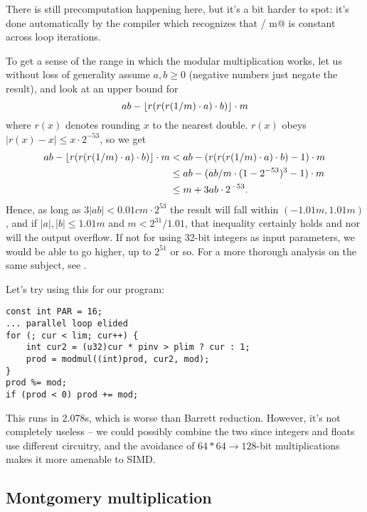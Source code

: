 There is still precomputation happening here, but it's a bit harder to spot: it's done automatically by the compiler which recognizes that  / m@ is constant across loop iterations.

To get a sense of the range in which the modular multiplication works, let us without loss of generality assume $a,b \ge 0$ (negative numbers just negate the result), and look at an upper bound for
\[ ab - \lfloor r(r(r(1/m)\cdot a)\cdot b)\rfloor \cdot m \]
where $r(x)$ denotes rounding $x$ to the nearest double.
$r(x)$ obeys $|r(x) - x| \le x \cdot 2^{-53}$, so we get
\begin{align*}
ab - \lfloor r(r(r(1/m)\cdot a)\cdot b)\rfloor \cdot m
&< ab - (r(r(r(1/m)\cdot a)\cdot b) - 1) \cdot m \\
&\le ab - (ab/m \cdot (1 - 2^{-53})^3 - 1) \cdot m \\
&\le m + 3ab \cdot 2^{-53}.
\end{align*}
Hence, as long as $3|ab| < 0.01 c m \cdot 2^{53}$ the result will fall within $(-1.01m, 1.01m)$, and if $|a|,|b| \le 1.01 m$ and $m < 2^{31} / 1.01$, that inequality certainly holds and nor will the output overflow. If not for using 32-bit integers as input parameters, we would be able to go higher, up to $2^{51}$ or so. For a more thorough analysis on the same subject, see \cite{modmulproof}.

Let's try using this for our program:

\begin{lstlisting}
const int PAR = 16;
... parallel loop elided
for (; cur < lim; cur++) {
	int cur2 = (u32)cur * pinv > plim ? cur : 1;
	prod = modmul((int)prod, cur2, mod);
}
prod %= mod;
if (prod < 0) prod += mod;
\end{lstlisting}

This runs in 2.078s, which is worse than Barrett reduction. However, it's not completely useless -- we could possibly combine the two since integers and floats use different circuitry, and the avoidance of \mbox{$64*64\rightarrow128$}-bit multiplications makes it more amenable to SIMD.

\subsection{Montgomery multiplication}

